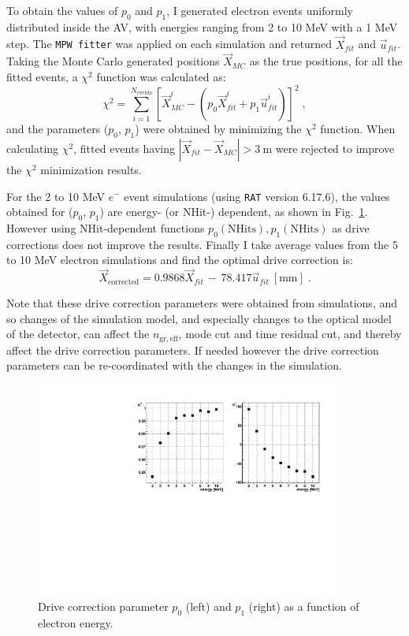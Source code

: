 To obtain the values of $p_0$ and $p_1$, I generated electron events uniformly distributed inside the AV, with energies ranging from 2 to 10 MeV with a 1 MeV step. The \texttt{MPW fitter} was applied on each simulation and returned $\vec{X}_{fit}$ and $\vec{u}_{fit}$. Taking the Monte Carlo generated positions $\vec{X}_{MC}$ as the true positions, for all the fitted events, a $\chi^2$ function was calculated as:
\begin{equation}
\chi^2 = \sum_{i=1}^{N_{\mathrm{events}}}[\vec{X}^i_{MC}-(p_0\vec{X}^i_{fit}+p_1\vec{u}^i_{fit})]^2 \; ,
\end{equation}
and the parameters ($p_0$, $p_1$) were obtained by minimizing the $\chi^2$ function. When calculating $\chi^2$, fitted events having $|\vec{X}_{fit}-\vec{X}_{MC}| > 3~\mathrm{m}$ were rejected to improve the $\chi^2$ minimization results.

For the 2 to 10 MeV $e^-$ event simulations (using \texttt{RAT} version 6.17.6), the values obtained for ($p_0$, $p_1$) are energy- (or NHit-) dependent, as shown in Fig.~\ref{fig:pullParVsEnergy}. However using NHit-dependent functions $p_0(\mathrm{NHits}), p_1(\mathrm{NHits})$ as drive corrections does not improve the results. Finally I take average values from the 5 to 10 MeV electron simulations and find the optimal drive correction is:
\begin{equation}
\vec{X}_{\mathrm{corrected}} = 0.9868\vec{X}_{fit} \, - \, 78.417\vec{u}_{fit}~\mathrm{[mm]}\;.
\end{equation}

Note that these drive correction parameters were obtained from simulations, and so changes of the simulation model, and especially changes to the optical model of the detector, can affect the $n_\mathrm{gr,eff}$, mode cut and time residual cut, and thereby affect the drive correction parameters. If needed however the drive correction parameters can be re-coordinated with the changes in the simulation.

\begin{figure}[!htb]
	\centering
	\includegraphics[width=10cm]{pullParVsEnergy.pdf}
	\caption{Drive correction parameter $p_0$ (left) and $p_1$ (right) as a function of electron energy.	\label{fig:pullParVsEnergy}}
\end{figure}

